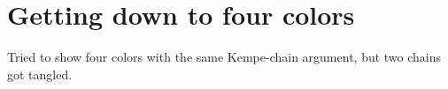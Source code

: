 \section{Getting down to four colors}

Tried to show four colors with the same Kempe-chain argument, but two chains got tangled.

